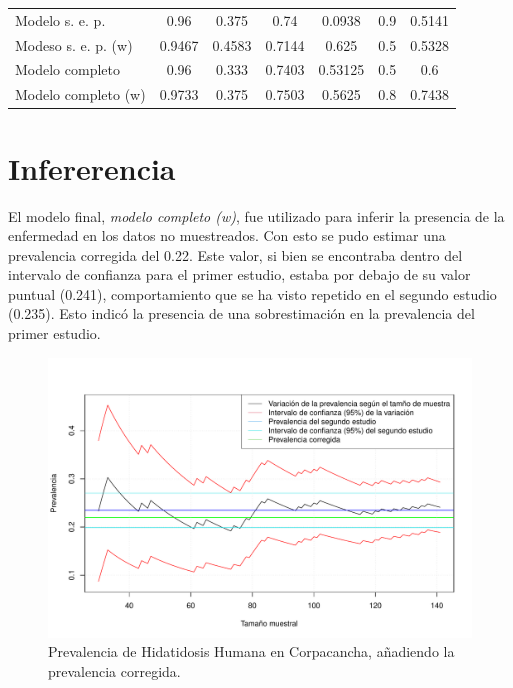 \begin{center}
\begin{table}[h]
\begin{tabular}{@{}lcccccc@{}}
			\multicolumn{1}{l|}{Modelo s. e. p.}        & 0.96          & 0.375        & \multicolumn{1}{c|}{0.74}   & 0.0938        & 0.9          & 0.5141 \\
			\multicolumn{1}{l|}{Modeso s. e. p. (w)}    & 0.9467        & 0.4583       & \multicolumn{1}{c|}{0.7144} & 0.625         & 0.5          & 0.5328 \\
			\multicolumn{1}{l|}{Modelo completo}        & 0.96          & 0.333        & \multicolumn{1}{c|}{0.7403} & 0.53125       & 0.5          & 0.6    \\
			\multicolumn{1}{l|}{Modelo completo (w)}    & 0.9733        & 0.375        & \multicolumn{1}{c|}{0.7503} & 0.5625        & 0.8          & 0.7438 \\ \bottomrule
		\end{tabular}
	\end{table}
	
\end{center}

\newpage

\section{Infererencia}

El modelo final, \textit{modelo completo (w)}, fue utilizado para inferir la presencia de la enfermedad en los datos no muestreados. Con esto se pudo estimar una prevalencia corregida del 0.22. Este valor, si bien se encontraba dentro del intervalo de confianza para el primer estudio, estaba por debajo de su valor puntual (0.241), comportamiento que se ha visto repetido en el segundo estudio (0.235). Esto indicó la presencia de una sobrestimación en la prevalencia del primer estudio.


\begin{figure}[h]
	\centering
	\includegraphics[width=1\textwidth]{graficos/prevalence_samplesize_fixed.pdf}
	\caption{Prevalencia de Hidatidosis Humana en Corpacancha, añadiendo la prevalencia corregida.}
	\label{prevalence_samplesize_fixed}
\end{figure}

